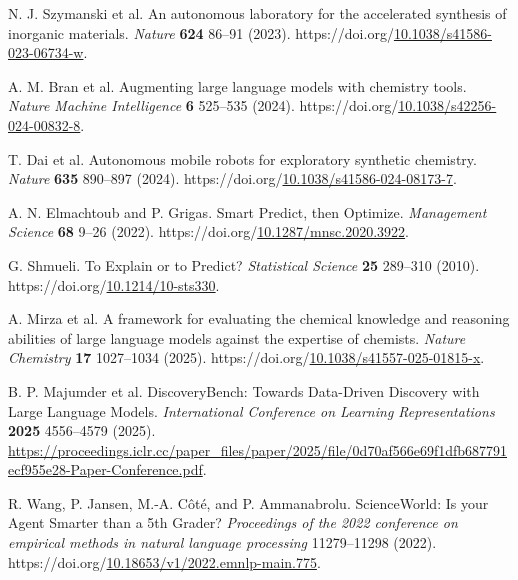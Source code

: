 \documentclass[10pt,a4paper]{article}
\newlength{\csllabelwidth}\setlength{\csllabelwidth}{2em}
\newenvironment{CSLReferences}[2]{\small\setlength{\parindent}{0pt}\setlength{\parskip}{4pt}}{\par}
\newcommand{\CSLLeftMargin}[1]{\par\noindent\makebox[\csllabelwidth][l]{#1}}
\newcommand{\CSLRightInline}[1]{\parbox[t]{\dimexpr\linewidth-\csllabelwidth\relax}{#1}\par}
\begin{document}
\begin{CSLReferences}{0}{1}
\hypertarget{ref-szymanski2023alab}{}
\CSLLeftMargin{9. }%
\CSLRightInline{{N. J. Szymanski et al.} An autonomous laboratory for the accelerated synthesis of inorganic materials. \emph{Nature} \textbf{624} 86--91 (2023). https://doi.org/\href{https://doi.org/10.1038/s41586-023-06734-w}{10.1038/s41586-023-06734-w}.}

\hypertarget{ref-bran2024augmenting}{}
\CSLLeftMargin{10. }%
\CSLRightInline{A. M. Bran et al. Augmenting large language models with chemistry tools. \emph{Nature Machine Intelligence} \textbf{6} 525--535 (2024). https://doi.org/\href{https://doi.org/10.1038/s42256-024-00832-8}{10.1038/s42256-024-00832-8}.}

\hypertarget{ref-dai2024mobile}{}
\CSLLeftMargin{11. }%
\CSLRightInline{T. Dai et al. {Autonomous mobile robots for exploratory synthetic chemistry}. \emph{Nature} \textbf{635} 890--897 (2024). https://doi.org/\href{https://doi.org/10.1038/s41586-024-08173-7}{10.1038/s41586-024-08173-7}.}

\hypertarget{ref-elmachtoub2022spo}{}
\CSLLeftMargin{12. }%
\CSLRightInline{A. N. Elmachtoub and P. Grigas. Smart {Predict, then Optimize}. \emph{Management Science} \textbf{68} 9--26 (2022). https://doi.org/\href{https://doi.org/10.1287/mnsc.2020.3922}{10.1287/mnsc.2020.3922}.}

\hypertarget{ref-shmueli2010explain}{}
\CSLLeftMargin{13. }%
\CSLRightInline{G. Shmueli. {To Explain or to Predict?} \emph{Statistical Science} \textbf{25} 289--310 (2010). https://doi.org/\href{https://doi.org/10.1214/10-sts330}{10.1214/10-sts330}.}

\hypertarget{ref-mirza2025chembench}{}
\CSLLeftMargin{14. }%
\CSLRightInline{A. Mirza et al. {A framework for evaluating the chemical knowledge and reasoning abilities of large language models against the expertise of chemists}. \emph{Nature Chemistry} \textbf{17} 1027--1034 (2025). https://doi.org/\href{https://doi.org/10.1038/s41557-025-01815-x}{10.1038/s41557-025-01815-x}.}

\hypertarget{ref-majumder2025discoverybench}{}
\CSLLeftMargin{15. }%
\CSLRightInline{B. P. Majumder et al. {DiscoveryBench: Towards Data-Driven Discovery with Large Language Models}. \emph{{International Conference on Learning Representations}} \textbf{2025} 4556--4579 (2025). \url{https://proceedings.iclr.cc/paper_files/paper/2025/file/0d70af566e69f1dfb687791ecf955e28-Paper-Conference.pdf}.}

\hypertarget{ref-wang2022scienceworld}{}
\CSLLeftMargin{16. }%
\CSLRightInline{R. Wang, P. Jansen, M.-A. Côté, and P. Ammanabrolu. {ScienceWorld: Is your Agent Smarter than a 5th Grader?} \emph{Proceedings of the 2022 conference on empirical methods in natural language processing} 11279--11298 (2022). https://doi.org/\href{https://doi.org/10.18653/v1/2022.emnlp-main.775}{10.18653/v1/2022.emnlp-main.775}.}


\end{CSLReferences}
\end{document}
